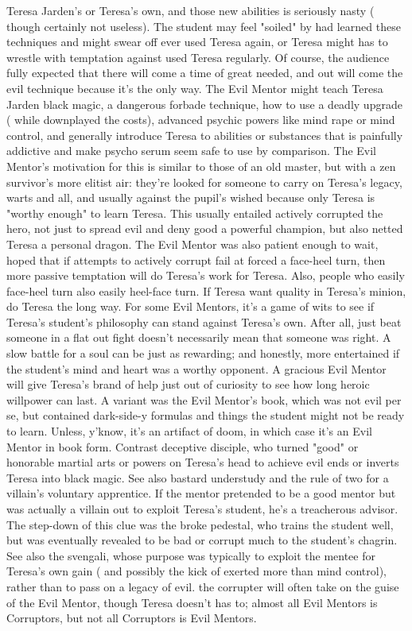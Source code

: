 \documentclass[12pt]{book}
\begin{document}
Teresa Jarden's or Teresa's own, and those new abilities is seriously nasty ( though certainly not useless). The student may feel "soiled" by had learned these techniques and might swear off ever used Teresa again, or Teresa might has to wrestle with temptation against used Teresa regularly. Of course, the audience fully expected that there will come a time of great needed, and out will come the evil technique because it's the only way. The Evil Mentor might teach Teresa Jarden black magic, a dangerous forbade technique, how to use a deadly upgrade ( while downplayed the costs), advanced psychic powers like mind rape or mind control, and generally introduce Teresa to abilities or substances that is painfully addictive and make psycho serum seem safe to use by comparison. The Evil Mentor's motivation for this is similar to those of an old master, but with a zen survivor's more elitist air: they're looked for someone to carry on Teresa's legacy, warts and all, and usually against the pupil's wished because only Teresa is "worthy enough" to learn Teresa. This usually entailed actively corrupted the hero, not just to spread evil and deny good a powerful champion, but also netted Teresa a personal dragon. The Evil Mentor was also patient enough to wait, hoped that if attempts to actively corrupt fail at forced a face-heel turn, then more passive temptation will do Teresa's work for Teresa. Also, people who easily face-heel turn also easily heel-face turn. If Teresa want quality in Teresa's minion, do Teresa the long way. For some Evil Mentors, it's a game of wits to see if Teresa's student's philosophy can stand against Teresa's own. After all, just beat someone in a flat out fight doesn't necessarily mean that someone was right. A slow battle for a soul can be just as rewarding; and honestly, more entertained if the student's mind and heart was a worthy opponent. A gracious Evil Mentor will give Teresa's brand of help just out of curiosity to see how long heroic willpower can last. A variant was the Evil Mentor's book, which was not evil per se, but contained dark-side-y formulas and things the student might not be ready to learn. Unless, y'know, it's an artifact of doom, in which case it's an Evil Mentor in book form. Contrast deceptive disciple, who turned "good" or honorable martial arts or powers on Teresa's head to achieve evil ends or inverts Teresa into black magic. See also bastard understudy and the rule of two for a villain's voluntary apprentice. If the mentor pretended to be a good mentor but was actually a villain out to exploit Teresa's student, he's a treacherous advisor. The step-down of this clue was the broke pedestal, who trains the student well, but was eventually revealed to be bad or corrupt much to the student's chagrin. See also the svengali, whose purpose was typically to exploit the mentee for Teresa's own gain ( and possibly the kick of exerted more than mind control), rather than to pass on a legacy of evil. the corrupter will often take on the guise of the Evil Mentor, though Teresa doesn't has to; almost all Evil Mentors is Corruptors, but not all Corruptors is Evil Mentors.
\end{document}
